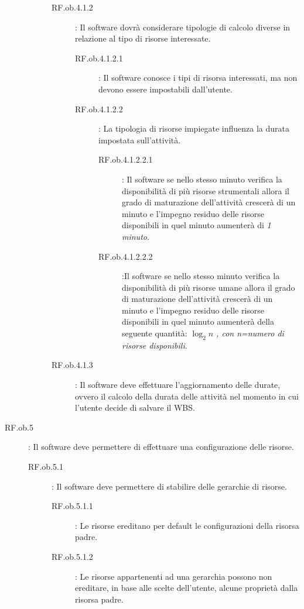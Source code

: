\begin{description}
\begin{description}
\begin{description}
		\item[RF.ob.4.1.2]: Il software dovr\`{a} considerare tipologie di calcolo diverse in relazione al tipo di risorse interessate.
			\begin{description}
			\item[RF.ob.4.1.2.1]: Il software conosce i tipi di risorsa interessati, ma non devono essere impostabili dall\textquoteright{}utente.
			\item[RF.ob.4.1.2.2]: La tipologia di risorse impiegate influenza la durata impostata sull\textquoteright{}attivit\`{a}.
				\begin{description}
				\item[RF.ob.4.1.2.2.1]: Il software se nello stesso minuto verifica la disponibilit\`{a} di pi\`{u} risorse strumentali allora il grado di maturazione dell\textquoteright{}attivit\`{a} crescer\`{a} di un minuto e l\textquoteright{}impegno residuo delle risorse disponibili in quel minuto aumenter\`{a} di \textit{1 minuto}.
				\item[RF.ob.4.1.2.2.2]:Il software se nello stesso minuto verifica la disponibilit\`{a} di pi\`{u} risorse umane allora il grado di maturazione dell\textquoteright{}attivit\`{a} crescer\`{a} di un minuto e l\textquoteright{}impegno residuo delle risorse disponibili in quel minuto aumenter\`{a} della seguente quantit\`{a}: \textit{$ \log_2 n $ , con n=numero di risorse disponibili}.
				\end{description}
			\end{description}
		\item[RF.ob.4.1.3]: Il software deve effettuare l\textquoteright{}aggiornamento delle durate, ovvero il calcolo della durata delle attivit\`{a} nel momento in cui l\textquoteright{}utente decide di salvare il WBS.
		\end{description}
	\end{description}
\item[RF.ob.5]: Il software deve permettere di effettuare una configurazione delle risorse.
	\begin{description}
	\item[RF.ob.5.1]: Il software deve permettere di stabilire delle gerarchie di risorse.
		\begin{description}
		\item[RF.ob.5.1.1]: Le risorse ereditano per default le configurazioni della risorsa padre.
		\item[RF.ob.5.1.2]: Le risorse appartenenti ad una gerarchia possono non ereditare, in base alle scelte dell\textquoteright{}utente, alcune propriet\`{a} dalla risorsa padre.

\end{description}
\end{description}
\end{description}
